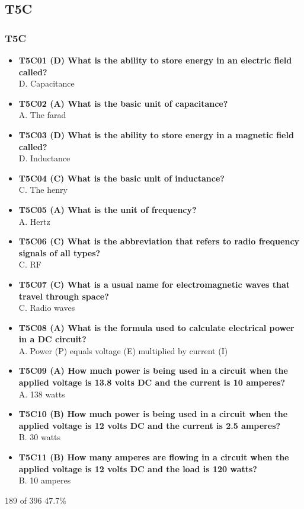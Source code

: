 \documentclass[10pt]{beamer}
\begin{document}
\subsection{T5C}
\begin{frame}
\frametitle{T5C}
\tiny
\begin{itemize}[<+->]
\item\textbf{T5C01 (D) What is the ability to store energy in an electric field called?}\\D. Capacitance
\item\textbf{T5C02 (A) What is the basic unit of capacitance?}\\A. The farad
\item\textbf{T5C03 (D) What is the ability to store energy in a magnetic field called?}\\D. Inductance
\item\textbf{T5C04 (C) What is the basic unit of inductance?}\\C. The henry
\item\textbf{T5C05 (A) What is the unit of frequency?}\\A. Hertz
\item\textbf{T5C06 (C) What is the abbreviation that refers to radio frequency signals of all types?}\\C. RF
\item\textbf{T5C07 (C) What is a usual name for electromagnetic waves that travel through space?}\\C. Radio waves
\item\textbf{T5C08 (A) What is the formula used to calculate electrical power in a DC circuit?}\\A. Power (P) equals voltage (E) multiplied by current (I)
\item\textbf{T5C09 (A) How much power is being used in a circuit when the applied voltage is 13.8 volts DC and the current is 10 amperes?}\\A. 138 watts
\item\textbf{T5C10 (B) How much power is being used in a circuit when the applied voltage is 12 volts DC and the current is 2.5 amperes?}\\B. 30 watts
\item\textbf{T5C11 (B) How many amperes are flowing in a circuit when the applied voltage is 12 volts DC and the load is 120 watts?}\\B. 10 amperes
\end{itemize}
\tiny 189 of 396  47.7\%
\end{frame}
\end{document}
